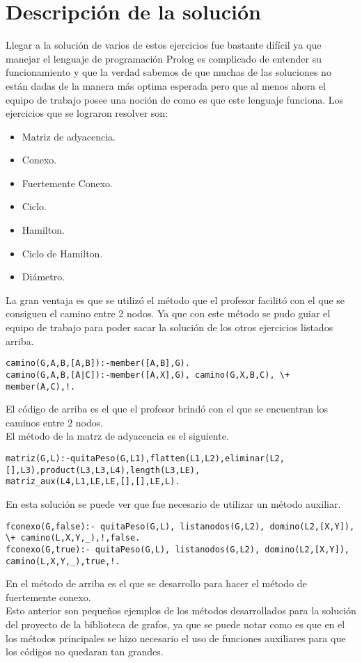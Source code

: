 \documentclass[10pt,a4paper]{article}
\begin{document}
\section{Descripción de la solución}
Llegar a la solución de varios de estos ejercicios fue bastante difícil ya que manejar el lenguaje de programación Prolog es complicado de entender su funcionamiento y que la verdad sabemos de que muchas de las soluciones no están dadas de la manera más optima esperada pero que al menos ahora el equipo de trabajo posee una noción de como es que este lenguaje funciona. Los ejercicios que se lograron resolver son:
\begin{itemize}
\item Matriz de adyacencia.
\item Conexo.
\item Fuertemente Conexo.
\item Ciclo.
\item Hamilton.
\item Ciclo de Hamilton.
\item Diámetro.
\end{itemize}
La gran ventaja es que se utilizó el método que el profesor facilitó con el que se consiguen el camino entre 2 nodos. Ya que con este método se pudo guiar el equipo de trabajo para poder sacar la solución de los otros ejercicios listados arriba. 
\begin{verbatim}
camino(G,A,B,[A,B]):-member([A,B],G).
camino(G,A,B,[A|C]):-member([A,X],G), camino(G,X,B,C), \+ member(A,C),!.
\end{verbatim}
El código de arriba es el que el profesor brindó con el que se encuentran los caminos entre 2 nodos.\\
El método de la matrz de adyacencia es el siguiente.
\begin{verbatim}
matriz(G,L):-quitaPeso(G,L1),flatten(L1,L2),eliminar(L2,[],L3),product(L3,L3,L4),length(L3,LE),
matriz_aux(L4,L1,LE,LE,[],[],LE,L).
\end{verbatim}
En esta solución se puede ver que fue necesario de utilizar un método auxiliar. 
\begin{verbatim}
fconexo(G,false):- quitaPeso(G,L), listanodos(G,L2), domino(L2,[X,Y]), \+ camino(L,X,Y,_),!,false.
fconexo(G,true):- quitaPeso(G,L), listanodos(G,L2), domino(L2,[X,Y]),  camino(L,X,Y,_),true,!.
\end{verbatim}
En el método de arriba es el que se desarrollo para hacer el método de fuertemente conexo.\\
Esto anterior son pequeños ejemplos de los métodos desarrollados para la solución del proyecto de la biblioteca de grafos, ya que se puede notar como es que en el los métodos principales se hizo necesario el uso de funciones auxiliares para que los códigos no quedaran tan grandes.\\
\pagebreak
\end{document}

